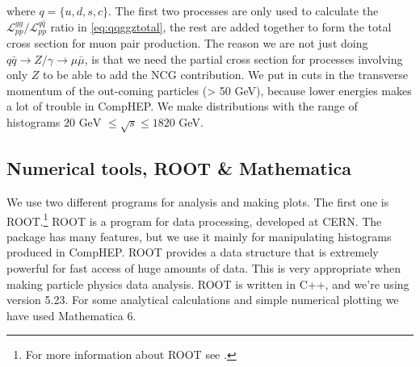 where $q = \{u,d,s,c\}$. The first two processes are only used to calculate the ${\mathcal{L}_{pp}^{gg}}/{\mathcal{L}_{pp}^{q \bar q}}$ ratio in \eqref{eq:qqggztotal}, the rest are added together to form the total cross section for muon pair production. The reason we are not just doing $q \bar q \rightarrow Z/ \gamma \rightarrow \mu \bar \mu$, is that we need the partial cross section for processes involving only $Z$ to be able to add the NCG contribution. We put in cuts in the transverse momentum of the out-coming particles (> 50 GeV), because lower energies makes a lot of trouble in CompHEP. We make distributions with the range of histograms $20 \mbox{ GeV } \leq \sqrt{s} \leq 1820$ GeV.

\subsection{Numerical tools, ROOT \& Mathematica}
We use two different programs for analysis and making plots. The first one is ROOT.\footnote{For more information about ROOT see \cite{rootweb}.} ROOT is a program for data processing, developed at CERN. The package has many features, but we use it mainly for manipulating histograms produced in CompHEP. ROOT provides a data structure that is extremely powerful for fast access of huge amounts of data. This is very appropriate when making particle physics data analysis. ROOT is written in C++, and we're using version 5.23. For some analytical calculations and simple numerical plotting we have used Mathematica 6.
